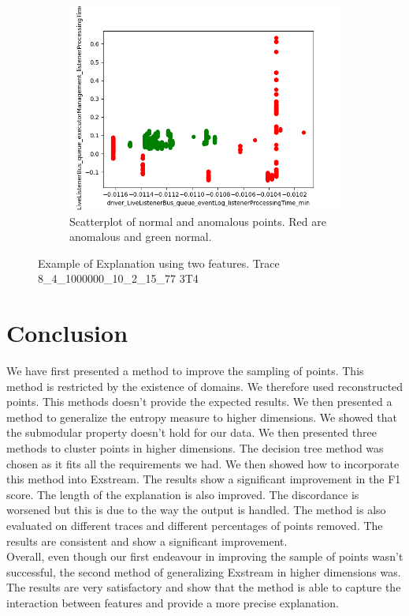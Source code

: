 \documentclass[oneside, a4paper, onecolumn, 11pt]{article}
\begin{document}
\begin{figure}[H]
\begin{subfigure}{0.30\textwidth}
    \includegraphics[width=\linewidth]{images/scatter duo.png}
    \caption{Scatterplot of normal and anomalous points. Red are anomalous and green normal.}
\end{subfigure}
  \caption{Example of Explanation using two features. Trace 8\_4\_1000000\_10\_2\_15\_77 3T4}
  \label{fig:decision_tree}
\end{figure}
\section{Conclusion}
We have first presented a method to improve the sampling of points. This method is restricted by the existence of domains. We therefore used reconstructed points. This methods doesn't provide the expected results. We then presented a method to generalize the entropy measure to higher dimensions. We showed that the submodular property doesn't hold for our data. We then presented three methods to cluster points in higher dimensions. The decision tree method was chosen as it fits all the requirements we had. We then showed how to incorporate this method into Exstream. The results show a significant improvement in the F1 score. The length of the explanation is also improved. The discordance is worsened but this is due to the way the output is handled. The method is also evaluated on different traces and different percentages of points removed. The results are consistent and show a significant improvement.\\
Overall, even though our first endeavour in improving the sample of points wasn't successful, the second method of generalizing Exstream in higher dimensions was. The results are very satisfactory and show that the method is able to capture the interaction between features and provide a more precise explanation.\\
\end{document}
